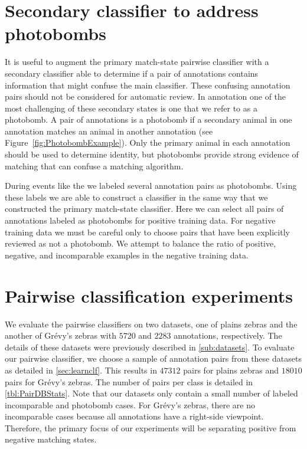 \section{Secondary classifier to address photobombs}\label{sec:learnpb}
    It is useful to augment the primary match-state pairwise classifier with a secondary classifier able to
      determine if a pair of annotations contains information that might confuse the main classifier.
    These confusing annotation pairs should not be considered for automatic review.
    In annotation one of the most challenging of these secondary states is one that we refer to as a {photobomb}.
    A pair of annotations is a photobomb if a secondary animal in one annotation matches an animal in another
      annotation (\eg see Figure~\ref{fig:PhotobombExample}).
    Only the primary animal in each annotation should be used to determine identity, but photobombs provide
      strong evidence of matching that can confuse a matching algorithm.

    \PhotobombExample{}

    During events like the \GZC{} we labeled several annotation pairs as photobombs.
    Using these labels we are able to construct a classifier in the same way that we constructed the primary
      match-state classifier.
    Here we can select all pairs of annotations labeled as photobombs for positive training data.
    For negative training data we must be careful only to choose pairs that have been explicitly reviewed as not
      a photobomb.
    We attempt to balance the ratio of positive, negative, and incomparable examples in the negative training
      data.

\section{Pairwise classification experiments}\label{sec:pairexpt}


    We evaluate the pairwise classifiers on two datasets, one of plains zebras and the another of Grévy's zebras
      with $5720$ and $2283$ annotations, respectively.
    The details of these datasets were previously described in \cref{sub:datasets}.
    To evaluate our pairwise classifier, we choose a sample of annotation pairs from these datasets as detailed
      in \cref{sec:learnclf}.
    This results in $47312$ pairs for plains zebras and $18010$ pairs for Grévy's zebras.
    The number of pairs per class is detailed in \cref{tbl:PairDBStats}.
    Note that our datasets only contain a small number of labeled incomparable and photobomb cases.
    For Grévy's zebras, there are no incomparable cases because all annotations have a right-side viewpoint.
    Therefore, the primary focus of our experiments will be separating positive from negative matching states.

